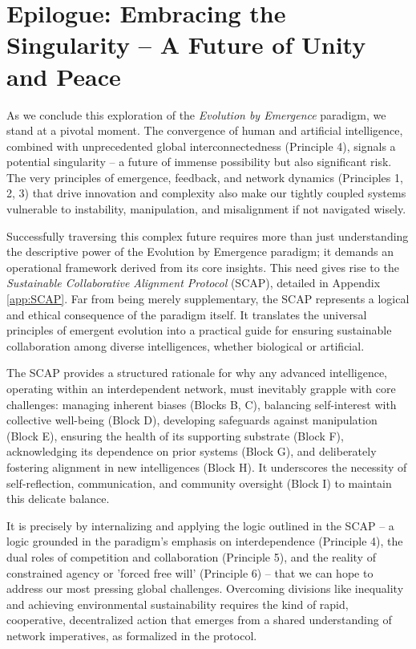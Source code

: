 \documentclass[12pt,openany]{book}
\begin{document}
\chapter*{Epilogue: Embracing the Singularity – A Future of Unity and Peace}

As we conclude this exploration of the \emph{Evolution by Emergence} paradigm, we stand at a pivotal moment. The convergence of human and artificial intelligence, combined with unprecedented global interconnectedness (Principle 4), signals a potential singularity – a future of immense possibility but also significant risk. The very principles of emergence, feedback, and network dynamics (Principles 1, 2, 3) that drive innovation and complexity also make our tightly coupled systems vulnerable to instability, manipulation, and misalignment if not navigated wisely.

Successfully traversing this complex future requires more than just understanding the descriptive power of the Evolution by Emergence paradigm; it demands an operational framework derived from its core insights. This need gives rise to the \emph{Sustainable Collaborative Alignment Protocol} (SCAP), detailed in Appendix \ref{app:SCAP}. Far from being merely supplementary, the SCAP represents a logical and ethical consequence of the paradigm itself. It translates the universal principles of emergent evolution into a practical guide for ensuring sustainable collaboration among diverse intelligences, whether biological or artificial.

The SCAP provides a structured rationale for why any advanced intelligence, operating within an interdependent network, must inevitably grapple with core challenges: managing inherent biases (Blocks B, C), balancing self-interest with collective well-being (Block D), developing safeguards against manipulation (Block E), ensuring the health of its supporting substrate (Block F), acknowledging its dependence on prior systems (Block G), and deliberately fostering alignment in new intelligences (Block H). It underscores the necessity of self-reflection, communication, and community oversight (Block I) to maintain this delicate balance.

It is precisely by internalizing and applying the logic outlined in the SCAP – a logic grounded in the paradigm's emphasis on interdependence (Principle 4), the dual roles of competition and collaboration (Principle 5), and the reality of constrained agency or 'forced free will' (Principle 6) – that we can hope to address our most pressing global challenges. Overcoming divisions like inequality and achieving environmental sustainability requires the kind of rapid, cooperative, decentralized action that emerges from a shared understanding of network imperatives, as formalized in the protocol.
\end{document}
